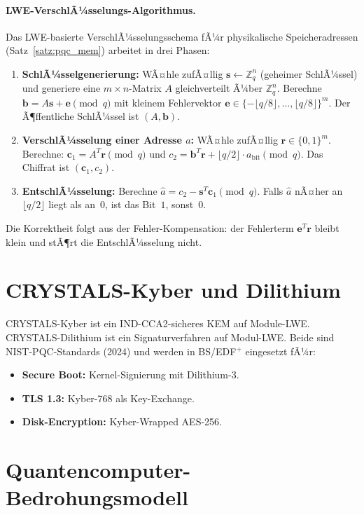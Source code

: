 ﻿\documentclass[a4paper,12pt]{scrreprt}
\theoremstyle{definition}
\begin{document}
	\paragraph{LWE-VerschlÃ¼sselungs-Algorithmus.}
	Das LWE-basierte VerschlÃ¼sselungsschema fÃ¼r physikalische Speicheradressen
	(Satz~\ref{satz:pqc_mem}) arbeitet in drei Phasen:
	\begin{enumerate}
		\item \textbf{SchlÃ¼sselgenerierung:} WÃ¤hle zufÃ¤llig
		$\mathbf{s} \gets \mathbb{Z}_q^n$ (geheimer SchlÃ¼ssel) und
		generiere eine $m \times n$-Matrix $A$ gleichverteilt Ã¼ber $\mathbb{Z}_q^n$.
		Berechne $\mathbf{b} = A\mathbf{s} + \mathbf{e} \pmod{q}$ mit kleinem
		Fehlervektor $\mathbf{e} \in \{-\lfloor q/8 \rfloor, \ldots, \lfloor q/8 \rfloor\}^m$.
		Der Ã¶ffentliche SchlÃ¼ssel ist $(A, \mathbf{b})$.
		\item \textbf{VerschlÃ¼sselung einer Adresse $a$:} WÃ¤hle zufÃ¤llig
		$\mathbf{r} \in \{0,1\}^m$. Berechne:
		$\mathbf{c}_1 = A^T \mathbf{r} \pmod{q}$ und
		$c_2 = \mathbf{b}^T \mathbf{r} + \lfloor q/2 \rfloor \cdot a_{\text{bit}} \pmod{q}$.
		Das Chiffrat ist $(\mathbf{c}_1, c_2)$.
		\item \textbf{EntschlÃ¼sselung:} Berechne
		$\hat{a} = c_2 - \mathbf{s}^T \mathbf{c}_1 \pmod{q}$.
		Falls $\hat{a}$ nÃ¤her an $\lfloor q/2 \rfloor$ liegt als an~$0$,
		ist das Bit~$1$, sonst~$0$.
	\end{enumerate}
	Die Korrektheit folgt aus der Fehler-Kompensation: der Fehlerterm
	$\mathbf{e}^T \mathbf{r}$ bleibt klein und stÃ¶rt die EntschlÃ¼sselung nicht.

	\section{CRYSTALS-Kyber und Dilithium}
	
	CRYSTALS-Kyber \cite{Bos2018} ist ein IND-CCA2-sicheres KEM auf Module-LWE.
	CRYSTALS-Dilithium \cite{Ducas2018} ist ein Signaturverfahren auf Modul-LWE.
	Beide sind NIST-PQC-Standards (2024) und werden in BS/EDF$^+$ eingesetzt fÃ¼r:
	\begin{itemize}
		\item \textbf{Secure Boot:} Kernel-Signierung mit Dilithium-3.
		\item \textbf{TLS 1.3:} Kyber-768 als Key-Exchange.
		\item \textbf{Disk-Encryption:} Kyber-Wrapped AES-256.
	\end{itemize}
	
	\section{Quantencomputer-Bedrohungsmodell}
	
\end{document}
